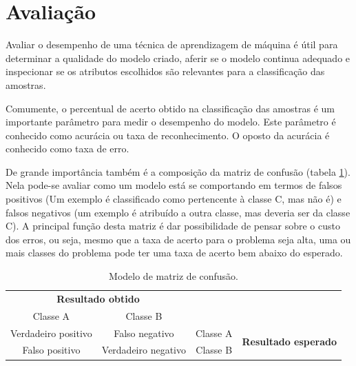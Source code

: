\section{Avaliação}\label{sec:avaliacao}

Avaliar o desempenho de uma técnica de aprendizagem de máquina é útil para determinar a qualidade do modelo criado, aferir se o modelo continua adequado e inspecionar se os atributos escolhidos são relevantes para a classificação das amostras.

Comumente, o percentual de acerto obtido na classificação das amostras é um importante parâmetro para medir o desempenho do modelo. Este parâmetro é conhecido como acurácia ou taxa de reconhecimento. O oposto da acurácia é conhecido como taxa de erro.

De grande importância também é a composição da matriz de confusão (tabela \ref{tab:matrixConfusao}). Nela pode-se avaliar como um modelo está se comportando em termos de falsos positivos (Um exemplo é classificado como pertencente à classe C, mas não é) e falsos negativos (um exemplo é atribuído a outra classe, mas deveria ser da classe C). A principal função desta matriz é dar possibilidade de pensar sobre o custo dos erros, ou seja, mesmo que a taxa de acerto para o problema seja alta, uma ou mais classes do problema pode ter uma taxa de acerto bem abaixo do esperado.

\begin{table}[h]
  \centering
  \begin{tabular}{cccc}
  \multicolumn{2}{c}{\textbf{Resultado obtido}}                  &                               &                                              \\ \cline{1-2}
  \multicolumn{1}{|c|}{Classe A} & \multicolumn{1}{c|}{Classe B} &                               &                                              \\ \cline{1-3}
  \multicolumn{1}{|c|}{Verdadeiro positivo}       & \multicolumn{1}{c|}{Falso negativo}       & \multicolumn{1}{c|}{Classe A} & \multirow{2}{*}{\textbf{Resultado esperado}} \\ \cline{1-3}
  \multicolumn{1}{|c|}{Falso positivo}       & \multicolumn{1}{c|}{Verdadeiro negativo}       & \multicolumn{1}{c|}{Classe B} &                                              \\ \cline{1-3}
  \end{tabular}
  \caption{Modelo de matriz de confusão.}
  \label{tab:matrixConfusao}
\end{table}

